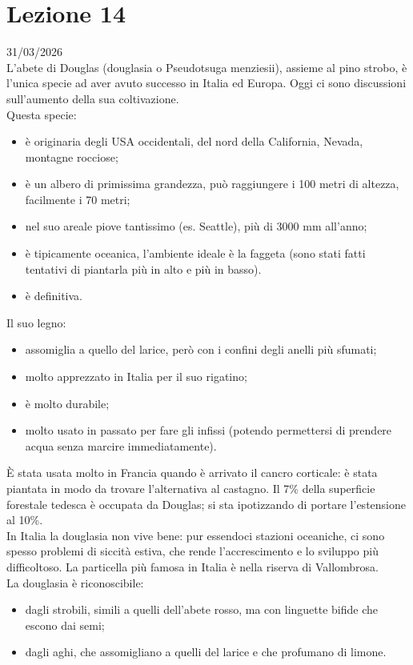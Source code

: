 \section{Lezione 14} \hfill 31/03/2026\\
L'abete di Douglas (douglasia o Pseudotsuga menziesii), assieme al pino strobo, è l'unica specie ad aver avuto successo in Italia ed Europa. Oggi ci sono discussioni sull'aumento della sua coltivazione.\\
Questa specie: 
\begin{itemize}[nosep]
    \item è originaria degli USA occidentali, del nord della California, Nevada, montagne rocciose;
    \item è un albero di primissima grandezza, può raggiungere i 100 metri di altezza, facilmente i 70 metri;
    \item nel suo areale piove tantissimo (es. Seattle), più di 3000 \unit{mm} all'anno;
    \item è tipicamente oceanica, l'ambiente ideale è la faggeta (sono stati fatti tentativi di piantarla più in alto e più in basso).
    \item è definitiva.
\end{itemize}
Il suo legno:
\begin{itemize}[nosep]
    \item assomiglia a quello del larice, però con i confini degli anelli più sfumati;
    \item molto apprezzato in Italia per il suo rigatino;
    \item è molto durabile;
    \item molto usato in passato per fare gli infissi (potendo permettersi di prendere acqua senza marcire immediatamente).
\end{itemize}
È stata usata molto in Francia quando è arrivato il cancro corticale: è stata piantata in modo da trovare l'alternativa al castagno. Il 7\% della superficie forestale tedesca è occupata da Douglas; si sta ipotizzando di portare l'estensione al 10\%.\\
In Italia la douglasia non vive bene: pur essendoci stazioni oceaniche, ci sono spesso problemi di siccità estiva, che rende l'accrescimento e lo sviluppo più difficoltoso. La particella più famosa in Italia è nella riserva di Vallombrosa.\\
La douglasia è riconoscibile:
\begin{itemize}[nosep]
    \item dagli strobili, simili a quelli dell'abete rosso, ma con linguette bifide che escono dai semi;
    \item dagli aghi, che assomigliano a quelli del larice e che profumano di limone.
\end{itemize}
